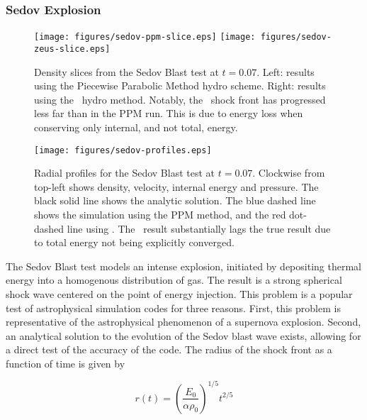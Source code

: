 \subsubsection{Sedov Explosion}
\label{sec.tests.sedov}

\begin{figure}
\begin{center}
\texttt{[image: figures/sedov-ppm-slice.eps]}
\texttt{[image: figures/sedov-zeus-slice.eps]}
\caption{Density slices from the Sedov Blast test at $t = 0.07$. Left:
results using the Piecewise Parabolic Method hydro scheme.  Right:
results using the \zeus\ hydro method. Notably, the \zeus\ shock front
has progressed less far than in the PPM run. This is due to energy
loss when conserving only internal, and not total, energy.}
\label{fig.sedov1}
\end{center}
\end{figure}


\begin{figure}
\begin{center}
\texttt{[image: figures/sedov-profiles.eps]}
\caption{Radial profiles for the Sedov Blast test at $t =
0.07$. Clockwise from top-left shows density, velocity, internal
energy and pressure.  The black solid line shows the analytic
solution.  The blue dashed line shows the simulation using the PPM
method, and the red dot-dashed line using \zeus.  The \zeus\ result
substantially lags the true result due to total energy not being
explicitly converged.}
\label{fig.sedov2}
\end{center}
\end{figure}

The Sedov Blast test \citep{Sedov1959} models an intense explosion,
initiated by depositing thermal energy into a homogenous distribution
of gas. The result is a strong spherical shock wave centered on the
point of energy injection.  This problem is a popular test of
astrophysical simulation codes for three reasons.  First, this problem
is representative of the astrophysical phenomenon of a supernova
explosion.  Second, an analytical solution to the evolution of the
Sedov blast wave exists, allowing for a direct test of the accuracy of
the code.  The radius of the shock front as a function of time is
given by


\begin{equation} r(t) =
\left(\frac{E_0}{\alpha\rho_0}\right)^{1/5}t^{2/5}
\end{equation}

